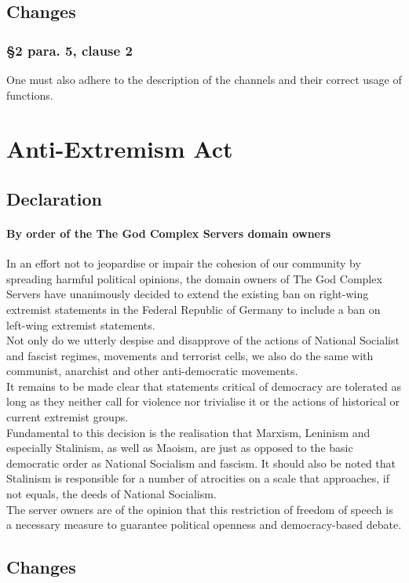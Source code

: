\documentclass{cjs9}
\begin{document}
\subsection{Changes}
\subsubsection*{§2 para. 5, clause 2}
One must also adhere to the description of the channels and their correct usage of functions.

\newpage
\section{Anti-Extremism Act}
\subsection{Declaration}
\paragraph{By order of the The God Complex Servers domain owners\\}
In an effort not to jeopardise or impair the cohesion of our community by spreading harmful political opinions, the domain owners of The God Complex Servers have unanimously decided to extend the existing ban on right-wing extremist statements in the Federal Republic of Germany to include a ban on left-wing extremist statements.
\\Not only do we utterly despise and disapprove of the actions of National Socialist and fascist regimes, movements and terrorist cells, we also do the same with communist, anarchist and other anti-democratic movements.
\\It remains to be made clear that statements critical of democracy are tolerated as long as they neither call for violence nor trivialise it or the actions of historical or current extremist groups.
\\Fundamental to this decision is the realisation that Marxism, Leninism and especially Stalinism, as well as Maoism, are just as opposed to the basic democratic order as National Socialism and fascism. It should also be noted that Stalinism is responsible for a number of atrocities on a scale that approaches, if not equals, the deeds of National Socialism.
\\The server owners are of the opinion that this restriction of freedom of speech is a necessary measure to guarantee political openness and democracy-based debate.\subsection{Changes}
\end{document}
